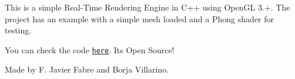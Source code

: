 This is a simple Real-\/\+Time Rendering Engine in C++ using Open\+GL 3.+. The project has an example with a simple mesh loaded and a Phong shader for testing.

You can check the code \href{https://github.com/fjavifabre/P5G3D}{\tt here}. It\textquotesingle{}s Open Source!

Made by F. Javier Fabre and Borja Villarino. 